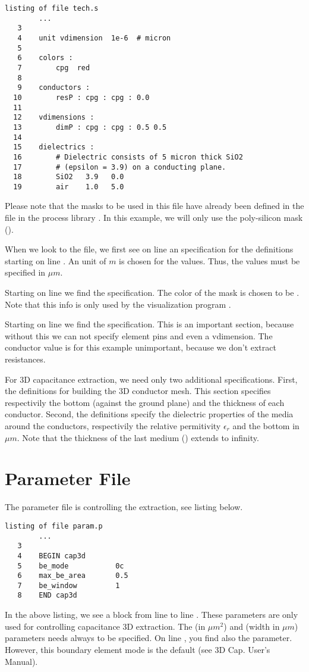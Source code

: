 \small \begin{Verbatim}[frame=single]
listing of file tech.s
        ...
   3
   4    unit vdimension  1e-6  # micron
   5
   6    colors :
   7        cpg  red
   8
   9    conductors :
  10        resP : cpg : cpg : 0.0
  11
  12    vdimensions :
  13        dimP : cpg : cpg : 0.5 0.5
  14
  15    dielectrics :
  16        # Dielectric consists of 5 micron thick SiO2
  17        # (epsilon = 3.9) on a conducting plane.
  18        SiO2   3.9   0.0
  19        air    1.0   5.0
\end{Verbatim}
\normalsize
Please note that the masks to be used in this file have already been defined
in the  file in the process library .
In this example, we will only use the poly-silicon mask ().

When we look to the file, we first see on line  an  specification
for the  definitions starting on line .
An unit of  $m$ is chosen for the values.
Thus, the values must be specified in $\mu m$.

Starting on line  we find the  specification.
The color of the  mask is chosen to be .
Note that this info is only used by the visualization program .

Starting on line  we find the  specification.
This is an important section, because without this we can not specify
element pins and even a vdimension.
The conductor value is for this example unimportant,
because we don't extract resistances.

For 3D capacitance extraction, we need only two additional specifications.
First, the  definitions for building the 3D conductor mesh.
This section specifies respectivily the bottom (against the ground plane) and the thickness
of each conductor.
Second, the  definitions specify the dielectric properties of the media
around the conductors, respectivily the relative permitivity $\epsilon_r$ and the bottom in $\mu m$.
Note that the thickness of the last medium () extends to infinity.

\section{Parameter File}
\label{PEparam}
The parameter file  is controlling the extraction, see listing below.

\small \begin{Verbatim}[frame=single]
listing of file param.p
        ...
   3
   4    BEGIN cap3d
   5    be_mode           0c
   6    max_be_area       0.5
   7    be_window         1
   8    END cap3d
\end{Verbatim}
\normalsize
In the above listing, we see a  block from line  to line .
These parameters are only used for controlling capacitance 3D extraction.
The  (in $\mu m^2$) and  (width in $\mu m$) parameters
needs always to be specified.
On line , you find also the  parameter.
However, this boundary element mode is the default (see 3D Cap. User's Manual).

